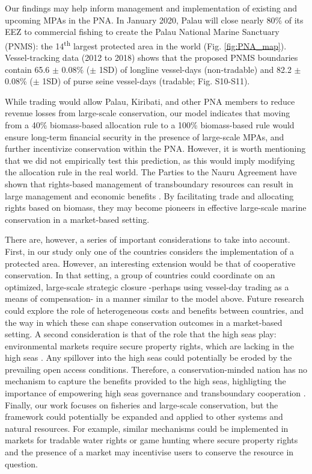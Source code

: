 \documentclass[12pt]{article}
\begin{document}
Our findings may help inform management and implementation of existing and upcoming MPAs in the PNA. In January 2020, Palau will close nearly 80\% of its EEZ to commercial fishing to create the Palau National Marine Sanctuary (PNMS): the 14\textsuperscript{th} largest protected area in the world (Fig. \ref{fig:PNA_map}). Vessel-tracking data (2012 to 2018) shows that the proposed PNMS boundaries contain 65.6 $\pm$ 0.08\% ($\pm$ 1SD) of longline vessel-days (non-tradable) and 82.2 $\pm$ 0.08\% ($\pm$ 1SD) of purse seine vessel-days (tradable; Fig. S10-S11).

While trading would allow Palau, Kiribati, and other PNA members to reduce revenue losses from large-scale conservation, our model indicates that moving from a 40\% biomass-based allocation rule to a 100\% biomass-based rule would ensure long-term financial security in the presence of large-scale MPAs, and further incentivize conservation within the PNA. However, it is worth mentioning that we did not empirically test this prediction, as this would imply modifying the allocation rule in the real world. The Parties to the Nauru Agreement have shown that rights-based management of transboundary resources can result in large management and economic benefits \cite{havice_2013,aqorau_2018}. By facilitating trade and allocating rights based on biomass, they may become pioneers in effective large-scale marine conservation in a market-based setting.

There are, however, a series of important considerations to take into account. First, in our study only one of the countries considers the implementation of a protected area. However, an interesting extension would be that of cooperative conservation. In that setting, a group of countries could coordinate on an optimized, large-scale strategic closure -perhaps using vessel-day trading as a means of compensation- in a manner similar to the model above. Future research could explore the role of heterogeneous costs and benefits between countries, and the way in which these can shape conservation outcomes in a market-based setting. A second consideration is that of the role that the high seas play: environmental markets require secure property rights, which are lacking in the high seas \cite{crespo_2019}. Any spillover into the high seas could potentially be eroded by the prevailing open access conditions. Therefore, a conservation-minded nation has no mechanism to capture the benefits provided to the high seas, highligting the importance of empowering high seas governance and transboundary cooperation \cite{aqorau_2018,crespo_2019}. Finally, our work focuses on fisheries and large-scale conservation, but the framework could potentially be expanded and applied to other systems and natural resources. For example, similar mechanisms could be implemented in markets for tradable water rights \cite{rosegrant_1994} or game hunting \cite{hutton_2003} where secure property rights and the presence of a market may incentivise users to conserve the resource in question.
\end{document}
